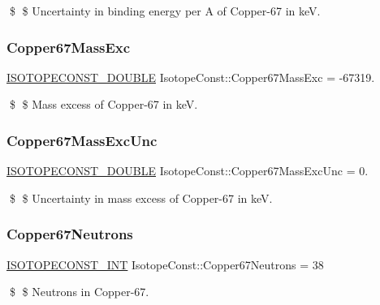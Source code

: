 \$ \$ Uncertainty in binding energy per A of Copper-\/67 in keV. \mbox{\label{group___isotope_const-_copper-_cu67_ga84aa1aaf091037a467c9ac4a73f86b2f}} 
\subsubsection{\texorpdfstring{Copper67\+Mass\+Exc}{Copper67MassExc}}
{\footnotesize\ttfamily \mbox{\hyperlink{group___isotope_const-_macros_ga8f45a7272ce02c0b4c65c44636ed719a}{I\+S\+O\+T\+O\+P\+E\+C\+O\+N\+S\+T\+\_\+\+D\+O\+U\+B\+LE}} Isotope\+Const\+::\+Copper67\+Mass\+Exc = -\/67319.}

\$ \$ Mass excess of Copper-\/67 in keV. \mbox{\label{group___isotope_const-_copper-_cu67_gadf05655c5ffcb2b06e483e56dc824314}} 
\subsubsection{\texorpdfstring{Copper67\+Mass\+Exc\+Unc}{Copper67MassExcUnc}}
{\footnotesize\ttfamily \mbox{\hyperlink{group___isotope_const-_macros_ga8f45a7272ce02c0b4c65c44636ed719a}{I\+S\+O\+T\+O\+P\+E\+C\+O\+N\+S\+T\+\_\+\+D\+O\+U\+B\+LE}} Isotope\+Const\+::\+Copper67\+Mass\+Exc\+Unc = 0.}

\$ \$ Uncertainty in mass excess of Copper-\/67 in keV. \mbox{\label{group___isotope_const-_copper-_cu67_ga2e13d95682139d0e2f0ae7fbaed29605}} 
\subsubsection{\texorpdfstring{Copper67\+Neutrons}{Copper67Neutrons}}
{\footnotesize\ttfamily \mbox{\hyperlink{group___isotope_const-_macros_ga5f18360b3e99483a35c32d789e62621c}{I\+S\+O\+T\+O\+P\+E\+C\+O\+N\+S\+T\+\_\+\+I\+NT}} Isotope\+Const\+::\+Copper67\+Neutrons = 38}

\$ \$ Neutrons in Copper-\/67. \mbox{\label{group___isotope_const-_copper-_cu67_ga1d538f566fab38e08b03c0dea4ca1384}} 
